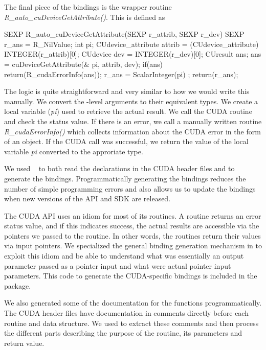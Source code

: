 \documentclass[article]{jss}
\def\C{\proglang{C}}
\def\R{\proglang{R}}
\def\Rpkg#1{\pkg{#1}}
\def\Cfunc#1{\textit{#1()}}
\def\Cvar#1{\textit{#1}}
\begin{document}
The final piece of the bindings is the \C{} wrapper routine
\Cfunc{R\_auto\_cuDeviceGetAttribute}. This is defined as 
\begin{CCode}
SEXP
R_auto_cuDeviceGetAttribute(SEXP r_attrib, SEXP r_dev)
{
    SEXP r_ans = R_NilValue;
    int pi;
    CUdevice_attribute attrib = (CUdevice_attribute) INTEGER(r_attrib)[0];
    CUdevice dev = INTEGER(r_dev)[0];
    CUresult ans;
    ans = cuDeviceGetAttribute(& pi,  attrib,  dev);
    if(ans)
       return(R_cudaErrorInfo(ans));
    r_ans = ScalarInteger(pi) ;
    return(r_ans);
}
\end{CCode}
The logic is quite straightforward and very similar to how we would
write this manually. We convert the \R-level arguments to their
equivalent \C{} types.  We create a local variable (\Cvar{pi}) used to
retrieve the actual result.  We call the CUDA routine and check the
status value.  If there is an error, we call a manually written
routine \Cfunc{R\_cudaErrorInfo} which collects information about the
CUDA error in the form of an \R{} object.  If the CUDA call was
successful, we return the value of the local variable \Cvar{pi}
converted to the approriate \R{} type.



We used \Rpkg{RCIndex}~\citep{bib:RCIndex} to both read the
declarations in the CUDA header files and to generate the bindings.
Programmatically generating the bindings reduces the number of simple
programming errors and also allows us to update the bindings when new
versions of the API and SDK are released.

The CUDA API uses an idiom for most of its routines.  A routine
returns an error status value, and if this indicates success, the
actual results are accessible via the pointers we passed to the
routine. In other words, the routines return their values via input
pointers.  We specialized the general binding generation mechanism in
\Rpkg{RCIndex} to exploit this idiom and be able to understand what
was essentially an output parameter passed as a pointer input and what
were actual pointer input parameters.  This code to generate the
CUDA-specific bindings is included in the package.

We also generated some of the documentation for the \R{} functions
programmatically.  The CUDA header files have documentation in
comments directly before each routine and data structure.  We used
\Rpkg{RCIndex} to extract these comments and then process the
different parts describing the purpose of the routine, its parameters
and return value.
\end{document}
